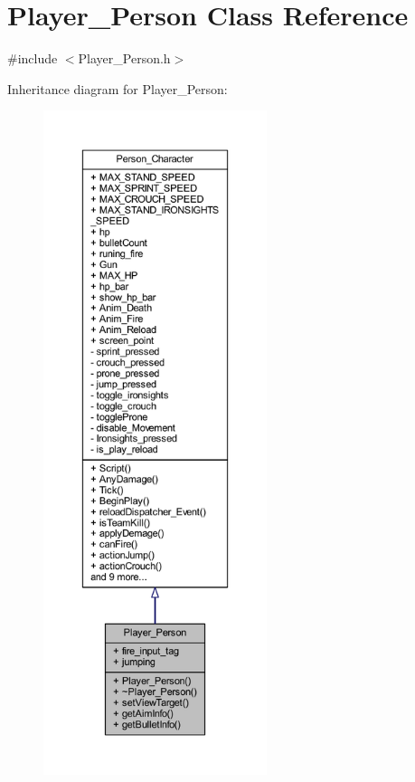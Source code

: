 \hypertarget{class_player___person}{}\section{Player\+\_\+\+Person Class Reference}
\label{class_player___person}


{\ttfamily \#include $<$Player\+\_\+\+Person.\+h$>$}



Inheritance diagram for Player\+\_\+\+Person\+:\nopagebreak
\begin{figure}[H]
\begin{center}
\leavevmode
\includegraphics[height=550pt]{class_player___person__inherit__graph}
\end{center}
\end{figure}


